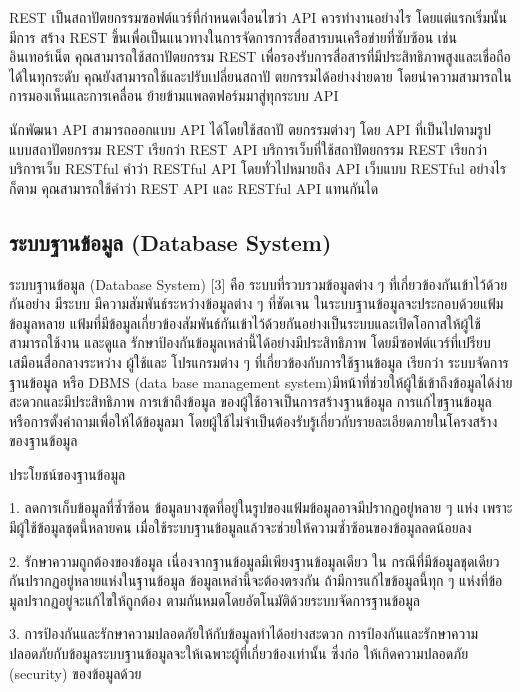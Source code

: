 REST เป็นสถาปัตยกรรมซอฟต์แวร์ที่กําหนดเงื่อนไขว่า API ควรทํางานอย่างไร โดยแต่แรกเริ่มนั้น มีการ
สร้าง REST ขึ้นเพื่อเป็นแนวทางในการจัดการการสื่อสารบนเครือข่ายที่ซับซ้อน เช่น อินเทอร์เน็ต คุณสามารถใช้สถาปัตยกรรม REST เพื่อรองรับการสื่อสารที่มีประสิทธิภาพสูงและเชื่อถือได้ในทุกระดับ คุณยังสามารถใช้และปรับเปลี่ยนสถาปั ตยกรรมได้อย่างง่ายดาย โดยนําความสามารถในการมองเห็นและการเคลื่อน
ย้ายข้ามแพลตฟอร์มมาสู่ทุกระบบ API

นักพัฒนา API สามารถออกแบบ API ได้โดยใช้สถาปั ตยกรรมต่างๆ โดย API ที่เป็นไปตามรูปแบบสถาปัตยกรรม REST เรียกว่า REST API บริการเว็บที่ใช้สถาปัตยกรรม REST เรียกว่าบริการเว็บ RESTful
คําว่า RESTful API โดยทั่วไปหมายถึง API เว็บแบบ RESTful อย่างไรก็ตาม คุณสามารถใช้คําว่า REST
API และ RESTful API แทนกันได

\subsection{ระบบฐานข้อมูล (Database System)}

ระบบฐานข้อมูล (Database System) [3] คือ ระบบที่รวบรวมข้อมูลต่าง ๆ ที่เกี่ยวข้องกันเข้าไว้ด้วยกันอย่าง
มีระบบ มีความสัมพันธ์ระหว่างข้อมูลต่าง ๆ ที่ชัดเจน ในระบบฐานข้อมูลจะประกอบด้วยแฟ้มข้อมูลหลาย
แฟ้มที่มีข้อมูลเกี่ยวข้องสัมพันธ์กันเข้าไว้ด้วยกันอย่างเป็นระบบและเปิดโอกาสให้ผู้ใช้สามารถใช้งาน และดูแล
รักษาป้องกันข้อมูลเหล่านี้ได้อย่างมีประสิทธิภาพ โดยมีซอฟต์แวร์ที่เปรียบเสมือนสื่อกลางระหว่าง ผู้ใช้และ
โปรแกรมต่าง ๆ ที่เกี่ยวข้องกับการใช้ฐานข้อมูล เรียกว่า ระบบจัดการฐานข้อมูล หรือ DBMS (data base
management system)มีหน้าที่ช่วยให้ผู้ใช้เข้าถึงข้อมูลได้ง่ายสะดวกและมีประสิทธิภาพ การเข้าถึงข้อมูล
ของผู้ใช้อาจเป็นการสร้างฐานข้อมูล การแก้ไขฐานข้อมูล หรือการตั้งคําถามเพื่อให้ได้ข้อมูลมา โดยผู้ใช้ไม่จําเป็นต้องรับรู้เกี่ยวกับรายละเอียดภายในโครงสร้างของฐานข้อมูล

ประโยชน์ของฐานข้อมูล

1. ลดการเก็บข้อมูลที่ซํ้าซ้อน
ข้อมูลบางชุดที่อยู่ในรูปของแฟ้มข้อมูลอาจมีปรากฏอยู่หลาย ๆ แห่ง เพราะมีผู้ใช้ข้อมูลชุดนี้หลายคน
เมื่อใช้ระบบฐานข้อมูลแล้วจะช่วยให้ความซํ้าซ้อนของข้อมูลลดน้อยลง

2. รักษาความถูกต้องของข้อมูล
เนื่องจากฐานข้อมูลมีเพียงฐานข้อมูลเดียว ใน กรณีที่มีข้อมูลชุดเดียวกันปรากฏอยู่หลายแห่งในฐานข้อมูล ข้อมูลเหล่านี้จะต้องตรงกัน ถ้ามีการแก้ไขข้อมูลนี้ทุก ๆ แห่งที่ข้อมูลปรากฏอยู่จะแก้ไขให้ถูกต้อง
ตามกันหมดโดยอัตโนมัติด้วยระบบจัดการฐานข้อมูล

3. การป้องกันและรักษาความปลอดภัยให้กับข้อมูลทําได้อย่างสะดวก
การป้องกันและรักษาความปลอดภัยกับข้อมูลระบบฐานข้อมูลจะให้เฉพาะผู้ที่เกี่ยวข้องเท่านั้น ซึ่งก่อ
ให้เกิดความปลอดภัย (security) ของข้อมูลด้วย


